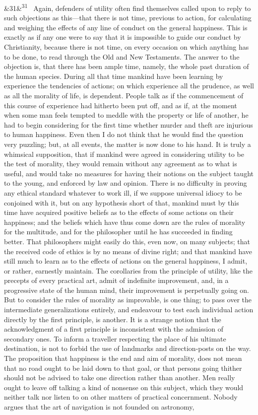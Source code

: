 \documentclass[12pt]{article}
\newcommand{\para}[1][]{\par\noindent\ifx&#1&\else\textsuperscript{\footnotesize #1}~\fi}
\begin{document}
\para[31] Again, defenders of utility often find themselves called upon to reply to such objections as this---that there is not time, previous to action, for calculating and weighing the effects of any line of conduct on the general happiness. This is exactly as if any one were to say that it is impossible to guide our conduct by Christianity, because there is not time, on every occasion on which anything has to be done, to read through the Old and New Testaments. The answer to the objection is, that there has been ample time, namely, the whole past duration of the human species. During all that time mankind have been learning by experience the tendencies of actions; on which experience all the prudence, as well as all the morality of life, is dependent. People talk as if the commencement of this course of experience had hitherto been put off, and as if, at the moment when some man feels tempted to meddle with the property or life of another, he had to begin considering for the first time whether murder and theft are injurious to human happiness. Even then I do not think that he would find the question very puzzling; but, at all events, the matter is now done to his hand. It is truly a whimsical supposition, that if mankind were agreed in considering utility to be the test of morality, they would remain without any agreement as to what is useful, and would take no measures for having their notions on the subject taught to the young, and enforced by law and opinion. There is no difficulty in proving any ethical standard whatever to work ill, if we suppose universal idiocy to be conjoined with it, but on any hypothesis short of that, mankind must by this time have acquired positive beliefs as to the effects of some actions on their happiness; and the beliefs which have thus come down are the rules of morality for the multitude, and for the philosopher until he has succeeded in finding better. That philosophers might easily do this, even now, on many subjects; that the received code of ethics is by no means of divine right; and that mankind have still much to learn as to the effects of actions on the general happiness, I admit, or rather, earnestly maintain. The corollaries from the principle of utility, like the precepts of every practical art, admit of indefinite improvement, and, in a progressive state of the human mind, their improvement is perpetually going on. But to consider the rules of morality as improvable, is one thing; to pass over the intermediate generalizations entirely, and endeavour to test each individual action directly by the first principle, is another. It is a strange notion that the acknowledgment of a first principle is inconsistent with the admission of secondary ones. To inform a traveller respecting the place of his ultimate destination, is not to forbid the use of landmarks and direction-posts on the way. The proposition that happiness is the end and aim of morality, does not mean that no road ought to be laid down to that goal, or that persons going thither should not be advised to take one direction rather than another. Men really ought to leave off talking a kind of nonsense on this subject, which they would neither talk nor listen to on other matters of practical concernment. Nobody argues that the art of navigation is not founded on astronomy, 
\end{document}
